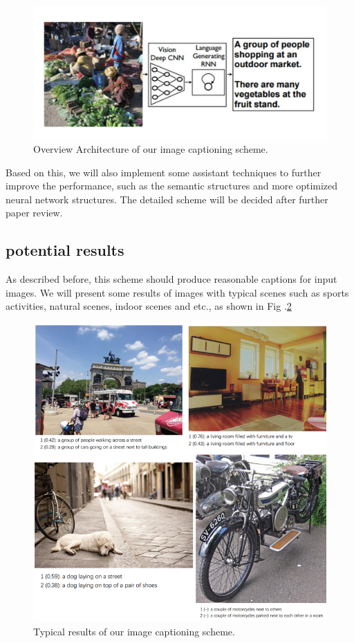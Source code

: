 \documentclass[conference]{IEEEtran}
\begin{document}
\begin{figure}
  \centering
  \includegraphics[width=1.0\linewidth]{figures/framework.pdf}
  \caption{Overview Architecture of our image captioning scheme.}\label{framework_fig}
\end{figure}

 Based on this, we will also implement some assistant techniques to further improve the performance, such as the semantic structures and more optimized neural network structures. The detailed scheme will be decided after further paper review.

\subsection{potential results}

As described before, this scheme should produce reasonable captions for input images. We will present some results of images with typical scenes such as sports activities, natural scenes, indoor scenes and etc., as shown in Fig .\ref{results_fig}

\begin{figure}
  \centering
  \includegraphics[width=1.0\linewidth]{figures/results.png}
  \caption{Typical results of our image captioning scheme.}\label{results_fig}
\end{figure}
\end{document}
